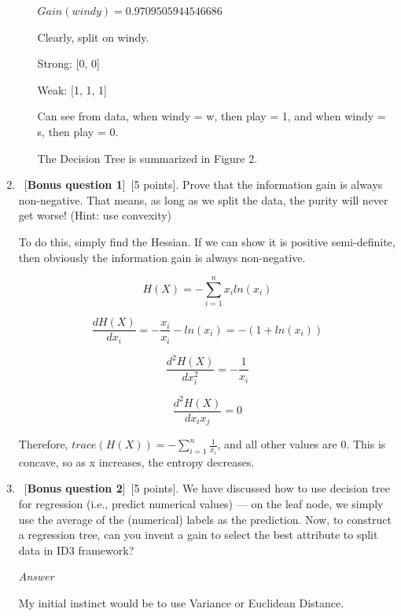 \documentclass[12pt, fullpage,letterpaper]{article}
\begin{document}
\begin{enumerate}
\begin{enumerate}
$Gain(windy)=0.9709505944546686$

\vspace{5mm}

Clearly, split on windy.

\vspace{5mm}

Strong: [0, 0]

Weak: [1, 1, 1]

\vspace{5mm}

Can see from data, when windy = w, then play = 1, and when windy = s, then play = 0.

\vspace{5mm}

The Decision Tree is summarized in Figure 2.

\end{enumerate}
\item ~[\textbf{Bonus question 1}]~[5 points].  Prove that the information gain is always non-negative.  That means, as long as we split the data, the purity will never get worse! (Hint: use convexity)

To do this, simply find the Hessian. If we can show it is positive semi-definite, then obviously the information gain is always non-negative.

\[
    H(X) = - \sum_{i=1}^n x_i ln(x_i)
\]

\[
    \frac{dH(X)}{dx_i} = -\frac{x_i}{x_i} - ln(x_i) = -(1 + ln(x_i))
\]

\[
    \frac{d^2H(X)}{dx_i^2} =  -\frac{1}{x_i}
\]

\[
    \frac{d^2H(X)}{dx_ix_j} =  0
\]

Therefore, $trace(H(X)) = -\sum_{i=1}^n \frac{1}{x_i}$, and all other values are 0. This is concave, so as x increases, the entropy decreases.

\item ~[\textbf{Bonus question 2}]~[5 points].  We have discussed how to use decision tree for regression (i.e., predict numerical values) --- on the leaf node, we simply use the average of the (numerical) labels as the prediction.  Now, to construct a regression tree, can you invent a gain to select the best attribute to split data in ID3 framework?

\emph{Answer}

My initial instinct would be to use Variance or Euclidean Distance.

\end{enumerate}
\end{document}
